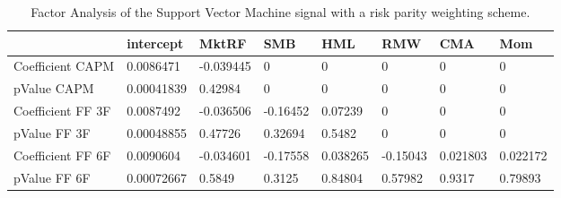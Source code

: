 \begin{table}[H]
\centering
\begin{tabular}{llllllll}
& intercept & MktRF & SMB & HML & RMW & CMA & Mom \\ 
\hline 
Coefficient CAPM & 0.0086471 & -0.039445 & 0 & 0 & 0 & 0 & 0 \\ 
pValue CAPM & 0.00041839 & 0.42984 & 0 & 0 & 0 & 0 & 0 \\ 
Coefficient FF 3F & 0.0087492 & -0.036506 & -0.16452 & 0.07239 & 0 & 0 & 0 \\ 
pValue FF 3F & 0.00048855 & 0.47726 & 0.32694 & 0.5482 & 0 & 0 & 0 \\ 
Coefficient FF 6F & 0.0090604 & -0.034601 & -0.17558 & 0.038265 & -0.15043 & 0.021803 & 0.022172 \\ 
pValue FF 6F & 0.00072667 & 0.5849 & 0.3125 & 0.84804 & 0.57982 & 0.9317 & 0.79893 \\ 
\hline
\end{tabular}
\caption{Factor Analysis of the Support Vector Machine signal with a risk parity weighting scheme.}
\label{SVM_MODEL_Risk_FACTOR}
\end{table}